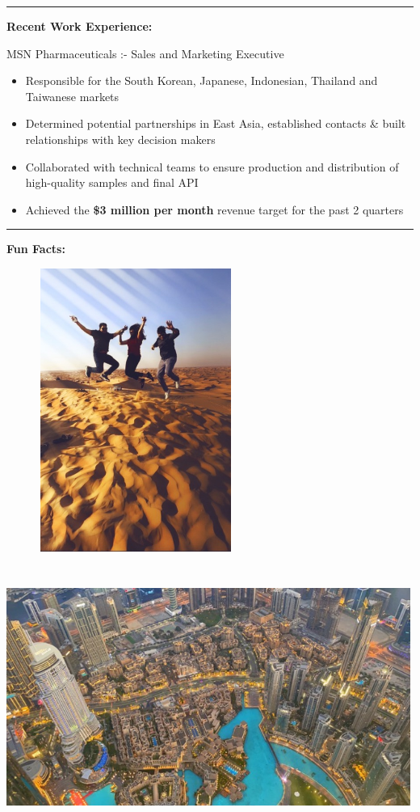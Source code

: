 \documentclass[
]{book}
\providecommand{\tightlist}{%
  \setlength{\itemsep}{0pt}\setlength{\parskip}{0pt}}
\begin{document}
\begin{center}\rule{0.5\linewidth}{0.5pt}\end{center}

\textbf{Recent Work Experience:}

MSN Pharmaceuticals :- Sales and Marketing Executive

\begin{itemize}
\tightlist
\item
  Responsible for the South Korean, Japanese, Indonesian, Thailand and Taiwanese markets
\item
  Determined potential partnerships in East Asia, established contacts \& built relationships with key decision makers
\item
  Collaborated with technical teams to ensure production and distribution of high-quality samples and final API
\item
  Achieved the \textbf{\$3 million per month} revenue target for the past 2 quarters
\end{itemize}

\begin{center}\rule{0.5\linewidth}{0.5pt}\end{center}

\textbf{Fun Facts:}

\includegraphics[width=3.33333in,height=3.64583in]{nikita4.jpeg} \includegraphics[width=5.20833in,height=3.64583in]{nikita5.jpeg}
\end{document}
